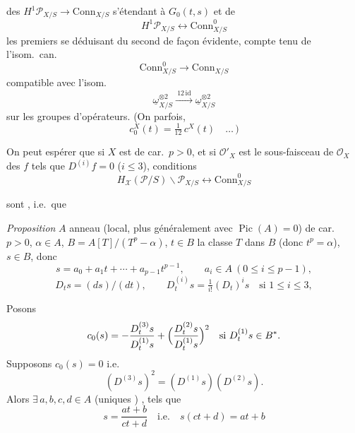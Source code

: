 \documentclass[11pt,a4paper]{article}
\begin{document}

des  $H^{1}\mathcal{P}_{X/S} \longrightarrow \mathrm{Conn}_{X/S}$ s'étendant à $G_0(t,s)$ et de
\[
H^{1}\mathcal{P}_{X/S} \longleftrightarrow \mathrm{Conn}^{0}_{X/S}
\]
les premiers se déduisant du second de façon évidente, compte tenu de l'isom.\ can.
\[
\mathrm{Conn}^{0}_{X/S} \longrightarrow \mathrm{Conn}_{X/S}
\]
compatible avec l'isom.
\[
\underline{\omega}_{X/S}^{\otimes 2} \xrightarrow{\ 12\,\mathrm{id}\ } \underline{\omega}_{X/S}^{\otimes 2}
\]
sur les groupes d'opérateurs. (On   parfois,
\[
c_{0}^{X}(t) = \tfrac{1}{12}\, c^{X}(t) \quad \ldots\,)
\]

On peut espérer que si $X$ est de car.\ $p > 0$, et si $\mathcal{O}'_X$ est le sous-faisceau  de $\mathcal{O}_X$  des $f$ tels que $D^{(i)}f = 0$ ($i \leqslant 3$), \struck{\ill{}}  conditions
\[
H_{\mathcal{X}}(\mathcal{P}/S) \backslash \mathcal{P}_{X/S} \longleftrightarrow \mathrm{Conn}^{0}_{X/S}
\]

sont , i.e.\ que \ill{}


\emph{Proposition} \struck{\ill{}} $A$ anneau (local, plus généralement avec $\operatorname{Pic}(A) = 0$) de car.\ $p > 0$, $\alpha \in A$, $B = A[T]/(T^{p} - \alpha)$, $t \in B$ la classe   $T$ dans $B$ (donc $t^{p} = \alpha$), \struck{\ill{}} $s \in B$, donc
\[
s = a_0 + a_1 t + \cdots + a_{p-1} t^{p-1}, \qquad a_i \in A \ (0 \leqslant i \leqslant p-1),
\]
\[
D_t s = (ds)/(dt), \qquad D^{(i)}_t s = \tfrac{1}{i!}(D_t)^{i}s \quad\text{si } 1 \leqslant i \leqslant 3,
\]


Posons 
\[
c_0(s) = -\frac{D^{(3)}_t s}{D^{(1)}_t s} + \Bigl(\frac{D^{(2)}_t s}{D^{(1)}_t s}\Bigr)^{2} \quad \text{si } D^{(1)}_t s \in B^{*}.
\]
Supposons $c_0(s) = 0$ i.e.
\[
(D^{(3)}s)^{2} = (D^{(1)}s)(D^{(2)}s).
\]
Alors $\exists\, a, b, c, d \in A$ (uniques  ) , tels que
\[
s = \frac{at + b}{ct + d} \quad\text{i.e.}\quad s(ct + d) = at + b
\]
\end{document}
